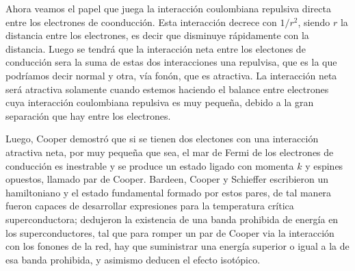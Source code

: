 Ahora veamos el papel que juega la interacción coulombiana repulsiva directa entre los electrones de coonducción. Esta interacción decrece con $1/r^2$, siendo $r$ la distancia entre los electrones, es decir que disminuye rápidamente con la distancia. Luego se tendrá que la interacción neta entre los electones de conducción sera la suma de estas dos interacciones una repulvisa, que es la que podríamos decir normal y otra, vía fonón, que es atractiva. La interacción neta será atractiva solamente cuando estemos haciendo el balance entre electrones cuya interacción coulombiana repulsiva es muy pequeña, debido a la gran separación que hay entre los electrones.

Luego, Cooper demostró que si se tienen dos electones con una interacción atractiva neta, por muy pequeña que sea, el mar de Fermi de los electrones de conducción es inestrable y se produce un estado ligado con momenta $k$ y espines opuestos, llamado par de Cooper. Bardeen, Cooper y Schieffer escribieron un hamiltoniano y el estado fundamental formado por estos pares, de tal manera fueron capaces de desarrollar expresiones para la temperatura crítica superconductora; dedujeron la existencia de una banda prohibida de energía en los superconductores, tal que para romper un par de Cooper via la interacción con los fonones de la red, hay que suministrar una energía superior o igual a la de esa banda prohibida, y asimismo deducen el efecto isotópico.

